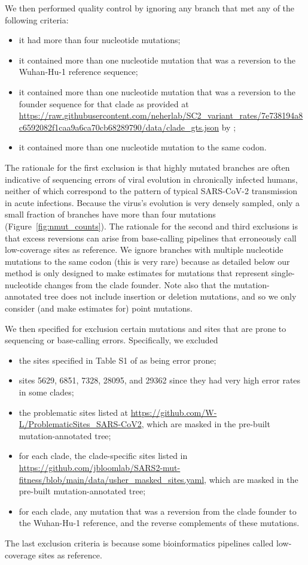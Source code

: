 \documentclass[9pt,twocolumn,twoside]{gsajnl_modified}
\begin{document}
{We then performed quality control by ignoring any branch that met any of the following criteria:
\begin{itemize}
\item it had more than four nucleotide mutations;
\item it contained more than one nucleotide mutation that was a reversion to the Wuhan-Hu-1 reference sequence;
\item it contained more than one nucleotide mutation that was a reversion to the founder sequence for that clade as provided at \url{https://raw.githubusercontent.com/neherlab/SC2_variant_rates/7e738194a8c6592082f1caa9a6ca70cb68289790/data/clade_gts.json} by \cite{neher2022contributions};
\item it contained more than one nucleotide mutation to the same codon.
\end{itemize}
The rationale for the first exclusion is that highly mutated branches are often indicative of sequencing errors of viral evolution in chronically infected humans, neither of which correspond to the pattern of typical SARS-CoV-2 transmission in acute infections.
Because the virus's evolution is very densely sampled, only a small fraction of branches have more than four mutations (Figure~\ref{fig:nmut_counts}).
The rationale for the second and third exclusions is that excess reversions can arise from base-calling pipelines that erroneously call low-coverage sites as reference.
We ignore branches with multiple nucleotide mutations to the same codon (this is very rare) because as detailed below our method is only designed to make estimates for mutations that represent single-nucleotide changes from the clade founder.
Note also that the mutation-annotated tree does not include insertion or deletion mutations, and so we only consider (and make estimates for) point mutations.

We then specified for exclusion certain mutations and sites that are prone to sequencing or base-calling errors.
Specifically, we excluded
\begin{itemize}
\item the sites specified in Table S1 of \cite{turakhia2020stability} as being error prone;
\item sites 5629, 6851, 7328, 28095, and 29362 since they had very high error rates in some clades;
\item the problematic sites listed at \url{https://github.com/W-L/ProblematicSites_SARS-CoV2}, which are masked in the pre-built mutation-annotated tree;
\item for each clade, the clade-specific sites listed in \url{https://github.com/jbloomlab/SARS2-mut-fitness/blob/main/data/usher_masked_sites.yaml}, which are masked in the pre-built mutation-annotated tree;
\item for each clade, any mutation that was a reversion from the clade founder to the Wuhan-Hu-1 reference, and the reverse complements of these mutations.
\end{itemize}
The last exclusion criteria is because some bioinformatics pipelines called low-coverage sites as reference.

}
\end{document}
